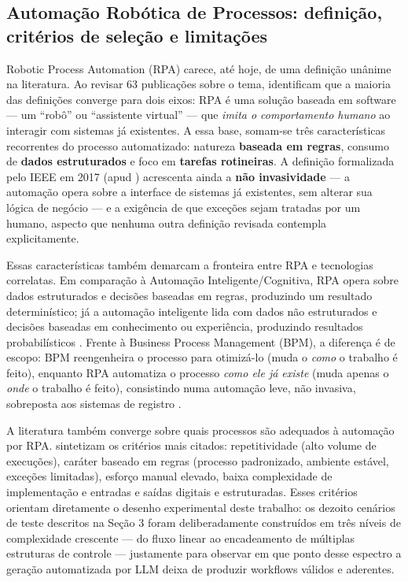 \documentclass[
	article,
	12pt,
	oneside,
	a4paper,
	section=TITLE,
	english,
	brazil,
	sumario=tradicional
	]{abntex2}
\begin{document}
\subsection{Automação Robótica de Processos: definição, critérios de seleção e limitações}

Robotic Process Automation (RPA) carece, até hoje, de uma definição
unânime na literatura. Ao revisar 63 publicações sobre o tema,
 identificam que a maioria das definições
converge para dois eixos: RPA é uma solução baseada em software --- um
``robô'' ou ``assistente virtual'' --- que \textit{imita o comportamento
humano} ao interagir com sistemas já existentes. A essa base, somam-se
três características recorrentes do processo automatizado: natureza
\textbf{baseada em regras}, consumo de \textbf{dados estruturados} e foco
em \textbf{tarefas rotineiras}. A definição formalizada pelo IEEE em 2017
(apud ) acrescenta ainda a \textbf{não
invasividade} --- a automação opera sobre a interface de sistemas já
existentes, sem alterar sua lógica de negócio --- e a exigência de que
exceções sejam tratadas por um humano, aspecto que nenhuma outra
definição revisada contempla explicitamente.

Essas características também demarcam a fronteira entre RPA e tecnologias
correlatas. Em comparação à Automação Inteligente/Cognitiva, RPA opera
sobre dados estruturados e decisões baseadas em regras, produzindo um
resultado determinístico; já a automação inteligente lida com dados não
estruturados e decisões baseadas em conhecimento ou experiência,
produzindo resultados probabilísticos \cite{wewerka2020}. Frente à
Business Process Management (BPM), a diferença é de escopo: BPM
reengenheira o processo para otimizá-lo (muda o \textit{como} o trabalho
é feito), enquanto RPA automatiza o processo \textit{como ele já existe}
(muda apenas o \textit{onde} o trabalho é feito), consistindo numa
automação leve, não invasiva, sobreposta aos sistemas de registro
\cite{wewerka2020}.

A literatura também converge sobre quais processos são adequados à
automação por RPA.  sintetizam os critérios mais
citados: repetitividade (alto volume de execuções), caráter baseado em
regras (processo padronizado, ambiente estável, exceções limitadas),
esforço manual elevado, baixa complexidade de implementação e entradas e
saídas digitais e estruturadas. Esses critérios orientam diretamente o
desenho experimental deste trabalho: os dezoito cenários de teste
descritos na Seção 3 foram deliberadamente construídos em três níveis de
complexidade crescente --- do fluxo linear ao encadeamento de múltiplas
estruturas de controle --- justamente para observar em que ponto desse
espectro a geração automatizada por LLM deixa de produzir workflows
válidos e aderentes.
\end{document}
